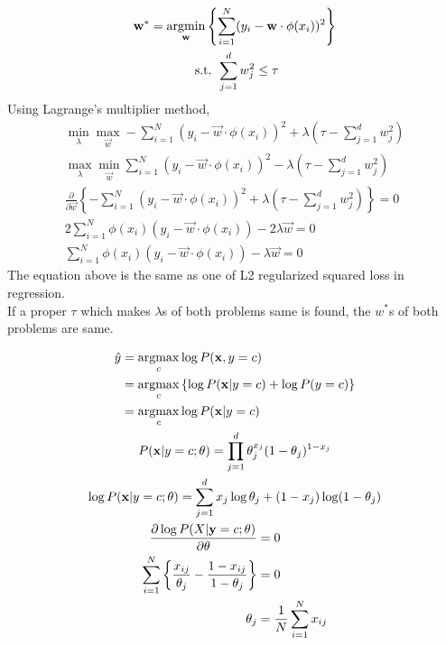 \documentclass{introtosml}
\newcommand{\x}{\vec{x}}
\newcommand{\w}{\vec{w}}
\newcommand\Lnb{\sum_{i=1}^N (y_i - \w \cdot \phi(x_i))^2}
\newcommand\Lnbl{- \Lnb + \lambda (\tau - \sum_{j=1}^d w_j^2)}
\begin{document}
\maketitle

\begin{p}
  \item
    \begin{gather*}
      \w^* = \argmin_\w \left\{ \sum_{i=1}^N (y_i - \w \cdot \phi(x_i))^2 \right\} \\
      \st \sum_{j=1}^d w_j^2 \le \tau \\
    \end{gather*}
    Using Lagrange's multiplier method,
    \begin{gather*}
      \min_\lambda \max_\w \Lnbl \\
      \max_\lambda \min_\w \Lnb - \lambda (\tau - \sum_{j=1}^d w_j^2) \\
      \frac{\partial}{\partial \w} \left\{ \Lnbl \right\} = 0 \\
      2 \sum_{i=1}^N \phi(x_i) (y_i - \w \cdot \phi(x_i)) - 2 \lambda \w = 0 \\
      \sum_{i=1}^N \phi(x_i) (y_i - \w \cdot \phi(x_i)) - \lambda \w = 0
    \end{gather*}
    The equation above is the same as one of L2 regularized squared
    loss in regression. \\
    \therefore If a proper $\tau$ which makes $\lambda$s of both problems same
    is found, the $w^*$s of both problems are same.

  \item
    \begin{gather*}
      \begin{aligned}
        \hat{y}
        & = \argmax_c \log P(\x, y = c) \\
        & = \argmax_c \left\{ \log P(\x | y = c) + \log P(y = c) \right\} \\
        & = \argmax_c \log P(\x | y = c)
      \end{aligned} \\
      P(\x | y = c; \theta) = \prod_{j=1}^d \theta_j^{x_j} (1 - \theta_j)^{1 - x_j} \\
      \log P(\x | y = c; \theta) = \sum_{j = 1}^d x_j \log \theta_j + (1 - x_j) \log (1 - \theta_j) \\
      \begin{aligned}
        \frac{\partial \log P(X | \vec{y} = c; \theta)}{\partial \theta} & = 0 \\
        \sum_{i=1}^N \left\{ \frac{x_{ij}}{\theta_j} - \frac{1 - x_{ij}}{1 - \theta_j} \right\} & = 0 \\
        \theta_j & = \frac{1}{N} \sum_{i=1}^N x_{ij}
      \end{aligned}
    \end{gather*}


\end{p}
\end{document}
